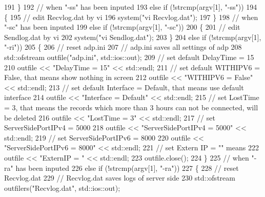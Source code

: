 \begin{DoxyCode}
191     \}
192     \textcolor{comment}{// when "-ss" has been inputed}
193     \textcolor{keywordflow}{else} \textcolor{keywordflow}{if} (!strcmp(argv[1], \textcolor{stringliteral}{"-ss"}))
194     \{
195         \textcolor{comment}{// edit Recvlog.dat by vi}
196         system(\textcolor{stringliteral}{"vi Recvlog.dat"});
197     \}
198     \textcolor{comment}{// when "-sc" has been inputed}
199     \textcolor{keywordflow}{else} \textcolor{keywordflow}{if} (!strcmp(argv[1], \textcolor{stringliteral}{"-sc"}))
200     \{
201         \textcolor{comment}{// edit Sendlog.dat by vi}
202         system(\textcolor{stringliteral}{"vi Sendlog.dat"});
203     \}
204     \textcolor{keywordflow}{else} \textcolor{keywordflow}{if} (!strcmp(argv[1], \textcolor{stringliteral}{"-ri"}))
205     \{
206         \textcolor{comment}{// reset adp.ini}
207         \textcolor{comment}{// adp.ini saves all settings of adp}
208         std::ofstream outfile(\textcolor{stringliteral}{"adp.ini"}, std::ios::out);
209         \textcolor{comment}{// set default DelayTime = 15}
210         outfile << \textcolor{stringliteral}{"DelayTime = 15"} << std::endl;
211         \textcolor{comment}{// set default WITHIPV6 = False, that means show nothing in screen}
212         outfile << \textcolor{stringliteral}{"WITHIPV6 = False"} << std::endl;
213         \textcolor{comment}{// set default Interface = Default, that means use default interface}
214         outfile << \textcolor{stringliteral}{"Interface = Default"} << std::endl;
215         \textcolor{comment}{// set LostTime = 3, that means the records which more than 3 hours can not be connected, will be
       deleted}
216         outfile << \textcolor{stringliteral}{"LostTime = 3"} << std::endl;
217         \textcolor{comment}{// set ServerSidePortIPv4 = 5000}
218         outfile << \textcolor{stringliteral}{"ServerSidePortIPv4 = 5000"} << std::endl;
219         \textcolor{comment}{// set ServerSidePortIPv6 = 8000}
220         outfile << \textcolor{stringliteral}{"ServerSidePortIPv6 = 8000"} << std::endl;
221         \textcolor{comment}{// set Extern IP = "" means}
222         outfile << \textcolor{stringliteral}{"ExternIP = "} << std::endl;
223         outfile.close();
224     \}
225     \textcolor{comment}{// when "-ra" has been inputed}
226     \textcolor{keywordflow}{else} \textcolor{keywordflow}{if} (!strcmp(argv[1], \textcolor{stringliteral}{"-ra"}))
227     \{
228         \textcolor{comment}{// reset Recvlog.dat}
229         \textcolor{comment}{// Recvlog.dat saves logs of server side}
230         std::ofstream outfilers(\textcolor{stringliteral}{"Recvlog.dat"}, std::ios::out);

\end{DoxyCode}
